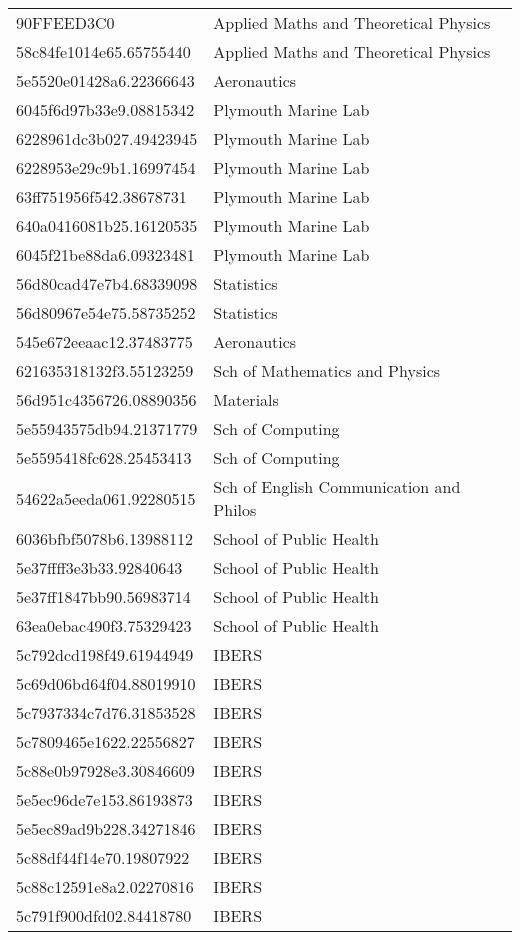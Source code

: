 \begin{tabular}{ll}
90FFEED3C0 & Applied Maths and Theoretical Physics \\
58c84fe1014e65.65755440 & Applied Maths and Theoretical Physics \\
5e5520e01428a6.22366643 & Aeronautics \\
6045f6d97b33e9.08815342 & Plymouth Marine Lab \\
6228961dc3b027.49423945 & Plymouth Marine Lab \\
6228953e29c9b1.16997454 & Plymouth Marine Lab \\
63ff751956f542.38678731 & Plymouth Marine Lab \\
640a0416081b25.16120535 & Plymouth Marine Lab \\
6045f21be88da6.09323481 & Plymouth Marine Lab \\
56d80cad47e7b4.68339098 & Statistics \\
56d80967e54e75.58735252 & Statistics \\
545e672eeaac12.37483775 & Aeronautics \\
621635318132f3.55123259 & Sch of Mathematics and Physics \\
56d951c4356726.08890356 & Materials \\
5e55943575db94.21371779 & Sch of Computing \\
5e5595418fc628.25453413 & Sch of Computing \\
54622a5eeda061.92280515 & Sch of English Communication and Philos \\
6036bfbf5078b6.13988112 & School of Public Health \\
5e37ffff3e3b33.92840643 & School of Public Health \\
5e37ff1847bb90.56983714 & School of Public Health \\
63ea0ebac490f3.75329423 & School of Public Health \\
5c792dcd198f49.61944949 & IBERS \\
5c69d06bd64f04.88019910 & IBERS \\
5c7937334c7d76.31853528 & IBERS \\
5c7809465e1622.22556827 & IBERS \\
5c88e0b97928e3.30846609 & IBERS \\
5e5ec96de7e153.86193873 & IBERS \\
5e5ec89ad9b228.34271846 & IBERS \\
5c88df44f14e70.19807922 & IBERS \\
5c88c12591e8a2.02270816 & IBERS \\
5c791f900dfd02.84418780 & IBERS \\

\end{tabular}
